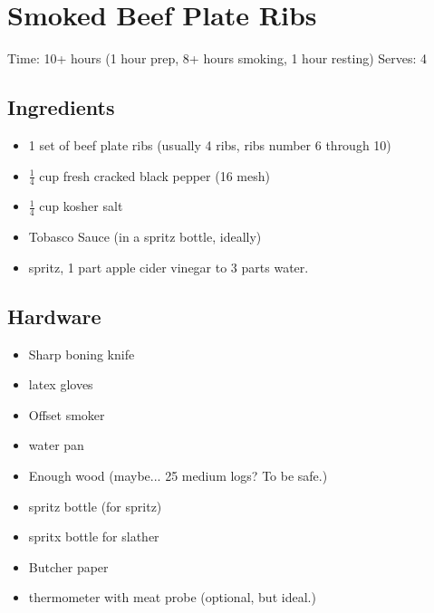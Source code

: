 \section{Smoked Beef Plate Ribs}
\label{smokedBeefPlateRibs}
\setcounter{secnumdepth}{0}
Time: 10+ hours (1 hour prep, 8+ hours smoking, 1 hour resting)
Serves: 4

\begin{multicols}{2}
\subsection*{Ingredients}
\begin{itemize}
    \item 1 set of beef plate ribs (usually 4 ribs, ribs number 6 through 10)
    \item \( \frac{1}{4} \) cup fresh cracked black pepper (16 mesh)
    \item \( \frac{1}{4} \) cup kosher salt
    \item Tobasco Sauce (in a spritz bottle, ideally)
    \item spritz, 1 part apple cider vinegar to 3 parts water.
\end{itemize}

\subsection*{Hardware}
\begin{itemize}
    \item Sharp boning knife
    \item latex gloves
    \item Offset smoker
    \item water pan
    \item Enough wood (maybe... 25 medium logs? To be safe.)
    \item spritz bottle (for spritz)
    \item spritx bottle for slather
    \item Butcher paper
    \item thermometer with meat probe (optional, but ideal.)
\end{itemize}
\clearpage


\end{multicols}
